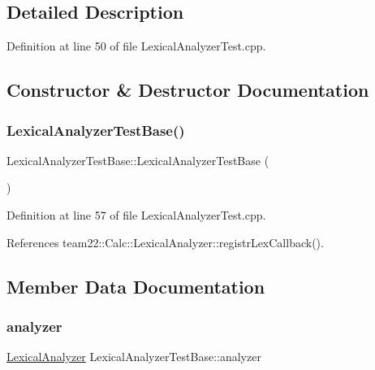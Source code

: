 \subsection{Detailed Description}


Definition at line 50 of file Lexical\+Analyzer\+Test.\+cpp.



\subsection{Constructor \& Destructor Documentation}
\mbox{\label{struct_lexical_analyzer_test_base_a260d79e4ec9a1b15f2c0c003ae2be078}} 
\subsubsection{\texorpdfstring{Lexical\+Analyzer\+Test\+Base()}{LexicalAnalyzerTestBase()}}
{\footnotesize\ttfamily Lexical\+Analyzer\+Test\+Base\+::\+Lexical\+Analyzer\+Test\+Base (\begin{DoxyParamCaption}{ }\end{DoxyParamCaption})\hspace{0.3cm}{\ttfamily [inline]}}



Definition at line 57 of file Lexical\+Analyzer\+Test.\+cpp.



References team22\+::\+Calc\+::\+Lexical\+Analyzer\+::registr\+Lex\+Callback().



\subsection{Member Data Documentation}
\mbox{\label{struct_lexical_analyzer_test_base_a4a9e40168e3b585b872642102a6dcb2b}} 
\subsubsection{\texorpdfstring{analyzer}{analyzer}}
{\footnotesize\ttfamily \hyperlink{classteam22_1_1_calc_1_1_lexical_analyzer}{Lexical\+Analyzer} Lexical\+Analyzer\+Test\+Base\+::analyzer}



